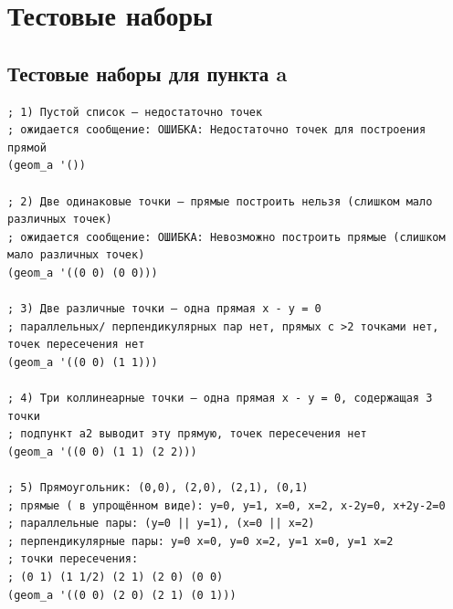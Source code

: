 \documentclass[a4paper, 11pt]{article}
\begin{document}
\section{Тестовые наборы}

\subsection*{Тестовые наборы для пункта a}
\begin{lstlisting}
; 1) Пустой список — недостаточно точек
; ожидается сообщение: ОШИБКА: Недостаточно точек для построения прямой
(geom_a '())

; 2) Две одинаковые точки — прямые построить нельзя (слишком мало различных точек)
; ожидается сообщение: ОШИБКА: Невозможно построить прямые (слишком мало различных точек)
(geom_a '((0 0) (0 0)))

; 3) Две различные точки — одна прямая x - y = 0
; параллельных/ перпендикулярных пар нет, прямых с >2 точками нет, точек пересечения нет
(geom_a '((0 0) (1 1)))

; 4) Три коллинеарные точки — одна прямая x - y = 0, содержащая 3 точки
; подпункт a2 выводит эту прямую, точек пересечения нет
(geom_a '((0 0) (1 1) (2 2)))

; 5) Прямоугольник: (0,0), (2,0), (2,1), (0,1)
; прямые ( в упрощённом виде): y=0, y=1, x=0, x=2, x-2y=0, x+2y-2=0
; параллельные пары: (y=0 || y=1), (x=0 || x=2)
; перпендикулярные пары: y=0 x=0, y=0 x=2, y=1 x=0, y=1 x=2
; точки пересечения:
; (0 1) (1 1/2) (2 1) (2 0) (0 0)
(geom_a '((0 0) (2 0) (2 1) (0 1)))
\end{lstlisting}
\end{document}

